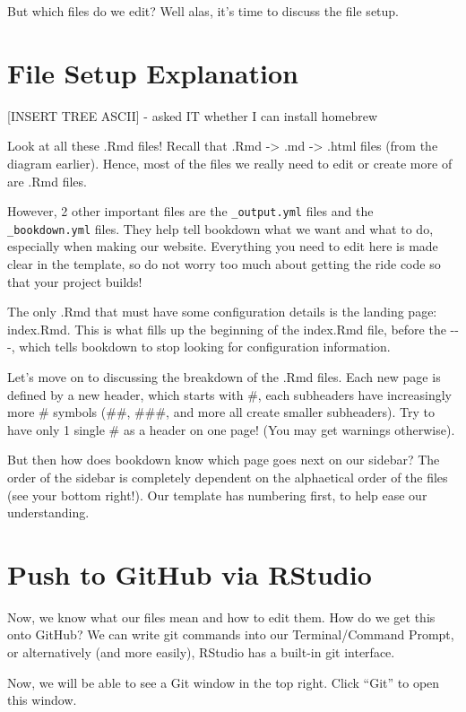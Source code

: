 \documentclass[
]{book}
\theoremstyle{definition}
\theoremstyle{definition}
\theoremstyle{definition}
\theoremstyle{definition}
\theoremstyle{remark}
\begin{document}
But which files do we edit? Well alas, it's time to discuss the file setup.

\section{File Setup Explanation}\label{file-setup}

{[}INSERT TREE ASCII{]} - asked IT whether I can install homebrew

Look at all these .Rmd files! Recall that .Rmd -\textgreater{} .md -\textgreater{} .html files (from the diagram earlier). Hence, most of the files we really need to edit or create more of are .Rmd files.

However, 2 other important files are the \texttt{\_output.yml} files and the \texttt{\_bookdown.yml} files. They help tell bookdown what we want and what to do, especially when making our website. Everything you need to edit here is made clear in the template, so do not worry too much about getting the ride code so that your project builds!

The only .Rmd that must have some configuration details is the landing page: index.Rmd. This is what fills up the beginning of the index.Rmd file, before the -\/-\/-, which tells bookdown to stop looking for configuration information.

Let's move on to discussing the breakdown of the .Rmd files. Each new page is defined by a new header, which starts with \#, each subheaders have increasingly more \# symbols (\#\#, \#\#\#, and more all create smaller subheaders). Try to have only 1 single \# as a header on one page! (You may get warnings otherwise).

But then how does bookdown know which page goes next on our sidebar? The order of the sidebar is completely dependent on the alphaetical order of the files (see your bottom right!). Our template has numbering first, to help ease our understanding.

\section{Push to GitHub via RStudio}\label{push-to-github-via-rstudio}

Now, we know what our files mean and how to edit them. How do we get this onto GitHub? We can write git commands into our Terminal/Command Prompt, or alternatively (and more easily), RStudio has a built-in git interface.

Now, we will be able to see a Git window in the top right. Click ``Git'' to open this window.
\end{document}
